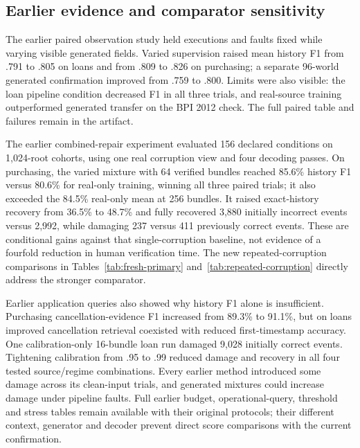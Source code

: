 


\subsection{Earlier evidence and comparator sensitivity}
The earlier paired observation study held executions and faults fixed while varying visible generated fields. Varied supervision raised mean history F1 from .791 to .805 on loans and from .809 to .826 on purchasing; a separate 96-world generated confirmation improved from .759 to .800. Limits were also visible: the loan pipeline condition decreased F1 in all three trials, and real-source training outperformed generated transfer on the BPI 2012 check. The full paired table and failures remain in the artifact.

The earlier combined-repair experiment evaluated 156 declared conditions on 1,024-root cohorts, using one real corruption view and four decoding passes. On purchasing, the varied mixture with 64 verified bundles reached 85.6\% history F1 versus 80.6\% for real-only training, winning all three paired trials; it also exceeded the 84.5\% real-only mean at 256 bundles. It raised exact-history recovery from 36.5\% to 48.7\% and fully recovered 3,880 initially incorrect events versus 2,992, while damaging 237 versus 411 previously correct events. These are conditional gains against that single-corruption baseline, not evidence of a fourfold reduction in human verification time. The new repeated-corruption comparisons in Tables~\ref{tab:fresh-primary} and~\ref{tab:repeated-corruption} directly address the stronger comparator.

Earlier application queries also showed why history F1 alone is insufficient. Purchasing cancellation-evidence F1 increased from 89.3\% to 91.1\%, but on loans improved cancellation retrieval coexisted with reduced first-timestamp accuracy. One calibration-only 16-bundle loan run damaged 9,028 initially correct events. Tightening calibration from .95 to .99 reduced damage and recovery in all four tested source/regime combinations. Every earlier method introduced some damage across its clean-input trials, and generated mixtures could increase damage under pipeline faults. Full earlier budget, operational-query, threshold and stress tables remain available with their original protocols; their different context, generator and decoder prevent direct score comparisons with the current confirmation.

